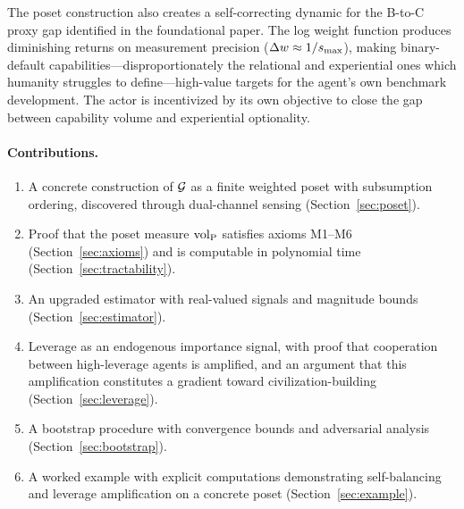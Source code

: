 The poset construction also creates a self-correcting dynamic for the B-to-C
proxy gap identified in the foundational paper. The log weight function
produces diminishing returns on measurement precision ($\Delta w \approx
1/s_{\mathrm{max}}$), making binary-default capabilities---disproportionately the
relational and experiential ones which humanity struggles to
define---high-value targets for the agent's own benchmark development. The
actor is incentivized by its own objective to close the gap between capability
volume and experiential optionality.

\paragraph{Contributions.}
\begin{enumerate}
\item A concrete construction of $\mathcal{G}$ as a finite weighted poset with
  subsumption ordering, discovered through dual-channel sensing
  (Section~\ref{sec:poset}).
\item Proof that the poset measure ${\operatorname{vol}_{\mathrm{P}}}$ satisfies axioms M1--M6
  (Section~\ref{sec:axioms}) and is computable in polynomial time
  (Section~\ref{sec:tractability}).
\item An upgraded estimator with real-valued signals and magnitude bounds
  (Section~\ref{sec:estimator}).
\item Leverage as an endogenous importance signal, with proof that
  cooperation between high-leverage agents is amplified, and an argument
  that this amplification constitutes a gradient toward
  civilization-building (Section~\ref{sec:leverage}).
\item A bootstrap procedure with convergence bounds and adversarial
  analysis (Section~\ref{sec:bootstrap}).
\item A worked example with explicit computations demonstrating
  self-balancing and leverage amplification on a concrete poset
  (Section~\ref{sec:example}).
\end{enumerate}
